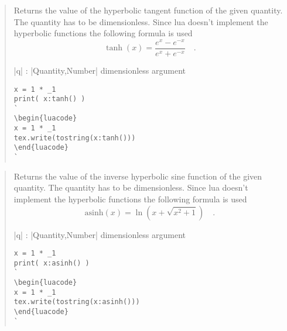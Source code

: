\documentclass{ltxdoc}
\begin{document}
\begin{quote}
  Returns the value of the hyperbolic tangent function of the given quantity. The quantity has to be dimensionless. Since lua doesn't implement the hyperbolic functions the following formula is used 
  $$
    \tanh(x) = \frac{e^x - e^{-x}}{e^x + e^{-x}} \quad.
  $$


  \begin{description}
  \item |q| : |Quantity,Number| dimensionless argument
  \end{description}

\begin{lstlisting}
x = 1 * _1
print( x:tanh() )
`
\begin{luacode}
x = 1 * _1
tex.write(tostring(x:tanh()))
\end{luacode}
`
\end{lstlisting}

\end{quote}




\begin{quote}
  Returns the value of the inverse hyperbolic sine function of the given quantity. The quantity has to be dimensionless. Since lua doesn't implement the hyperbolic functions the following formula is used 
  $$
    \text{asinh}(x) = \ln\left( x + \sqrt{x^2 + 1} \right)  \quad.
  $$


  \begin{description}
  \item |q| : |Quantity,Number| dimensionless argument
  \end{description}

\begin{lstlisting}
x = 1 * _1
print( x:asinh() )
`
\begin{luacode}
x = 1 * _1
tex.write(tostring(x:asinh()))
\end{luacode}
`
\end{lstlisting}

\end{quote}
\end{document}
